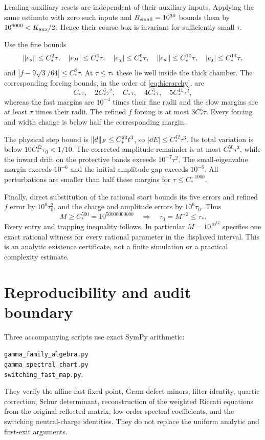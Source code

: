 \documentclass[11pt]{article}
\theoremstyle{remark}\newtheorem{remark}[theorem]{Remark}
\numberwithin{equation}{section}
\begin{document}
Leading auxiliary resets are independent of their auxiliary inputs. Applying the same estimate with zero such inputs and $B_{\rm small}=10^{30}$ bounds them by $10^{6000}<K_{\rm aux}/2$. Hence their coarse box is invariant for sufficiently small $\tau$.

Use the fine bounds
\[
 \lVert e_s\rVert\leq C_*^2\tau,\quad |e_H|\leq C_*^4\tau,\quad
 |e_\chi|\leq C_*^6\tau,\quad \lVert e_a\rVert\leq C_*^{10}\tau,
 \quad |e_j|\leq C_*^{14}\tau,
\]
and $|f-9\sqrt3/64|\leq C_*^8\tau$. At $\tau\leq\tau_*$ these lie well inside the thick chamber. The corresponding forcing bounds, in the order of \eqref{eq:hierarchy}, are
\[
 C_*\tau,\quad 2C_*^3\tau^2,\quad C_*\tau,\quad
 4C_*^7\tau,\quad5C_*^{11}\tau^2,
\]
whereas the fast margins are $10^{-4}$ times their fine radii and the slow margins are at least $\tau$ times their radii. The refined $f$ forcing is at most $3C_*^5\tau$. Every forcing and width change is below half the corresponding margin.

The physical step bound is $\lVert d\rVert_F\leq C_*^{20}t^3$, so $|\dd E|\leq C_*^{42}\tau^3$. Its total variation is below $10C_*^{42}\tau_0<1/10$. The corrected-amplitude remainder is at most $C_*^{50}\tau^3$, while the inward drift on the protective bands exceeds $10^{-7}\tau^2$. The small-eigenvalue margin exceeds $10^{-6}$ and the initial amplitude gap exceeds $10^{-6}$. All perturbations are smaller than half these margins for $\tau\leq C_*^{-1000}$.

Finally, direct substitution of the rational start bounds its five errors and refined $f$ error by $10^6\tau_0^2$, and the charge and amplitude errors by $10^6\tau_0$. Thus
\[
 M\geq C_*^{500}=10^{50000000000}
 \quad\Longrightarrow\quad \tau_0=M^{-2}\leq\tau_*.
\]
Every entry and trapping inequality follows. In particular $M=10^{10^{12}}$ specifies one exact rational witness for every rational parameter in the displayed interval. This is an analytic existence certificate, not a finite simulation or a practical complexity estimate.

\section{Reproducibility and audit boundary}
Three accompanying scripts use exact SymPy arithmetic:
\begin{center}\texttt{gamma\_family\_algebra.py}\\
\texttt{gamma\_spectral\_chart.py}\\
\texttt{switching\_fast\_map.py}.\end{center} They verify the affine fast fixed point, Gram-defect minors, filter identity, quartic correction, Schur determinant, reconstruction of the weighted Riccati equations from the original reflected matrix, low-order spectral coefficients, and the switching neutral-charge identities. They do not replace the uniform analytic and first-exit arguments.
\end{document}
